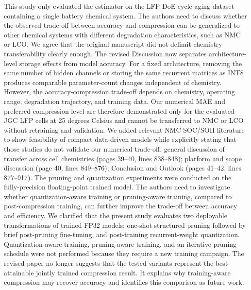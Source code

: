 \markdownRendererInterblockSeparator
{}\markdownRendererBlockQuoteBegin
This study only evaluated the estimator on the LFP DoE cycle aging dataset containing a single battery chemical system. The authors need to discuss whether the observed trade-off between accuracy and compression can be generalized to other chemical systems with different degradation characteristics, such as NMC or LCO.\markdownRendererBlockQuoteEnd \markdownRendererInterblockSeparator
{} We agree that the original manuscript did not delimit chemistry transferability clearly enough. The revised Discussion now separates architecture-level storage effects from model accuracy. For a fixed architecture, removing the same number of hidden channels or storing the same recurrent matrices as INT8 produces comparable parameter-count changes independent of chemistry. However, the accuracy-compression trade-off depends on chemistry, operating range, degradation trajectory, and training data. Our numerical MAE and preferred compression level are therefore demonstrated only for the evaluated JGC LFP cells at 25 degrees Celsius and cannot be transferred to NMC or LCO without retraining and validation. We added relevant NMC SOC/SOH literature to show feasibility of compact data-driven models while explicitly stating that those studies do not validate our numerical trade-off.\markdownRendererParagraphSeparator
{} general discussion of transfer across cell chemistries (pages 39--40, lines 838--848); platform and scope discussion (page 40, lines 849--876); Conclusion and Outlook (pages 41--42, lines 877--917).\markdownRendererInterblockSeparator
{}
\markdownRendererSectionEnd \markdownRendererSectionBegin
{}\markdownRendererInterblockSeparator
{}\markdownRendererBlockQuoteBegin
The pruning and quantization experiments were conducted on the fully-precision floating-point trained model. The authors need to investigate whether quantization-aware training or pruning-aware training, compared to post-compression training, can further improve the trade-off between accuracy and efficiency.\markdownRendererBlockQuoteEnd \markdownRendererInterblockSeparator
{} We clarified that the present study evaluates two deployable transformations of trained FP32 models: one-shot structured pruning followed by brief post-pruning fine-tuning, and post-training recurrent-weight quantization. Quantization-aware training, pruning-aware training, and an iterative pruning schedule were not performed because they require a new training campaign. The revised paper no longer suggests that the tested variants represent the best attainable jointly trained compression result. It explains why training-aware compression may recover accuracy and identifies this comparison as future work.\markdownRendererParagraphSeparator
